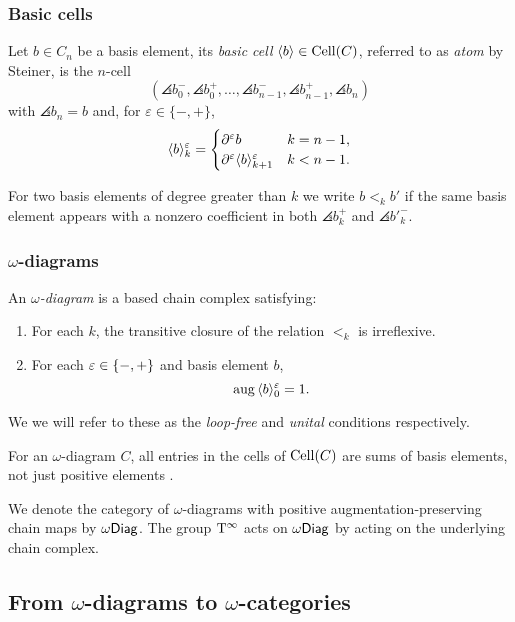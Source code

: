 \subsubsection{Basic cells}

Let $b \in C_n$ be a basis element, its \textit{basic cell} $\langle b\rangle \in \mathrm{Cell}(C)$, referred to as \textit{atom} by Steiner, is the $n$-cell
\[
(\angles{b}_0^-,\angles{b}_0^+,\dots,\angles{b}_{n-1}^-,\angles{b}_{n-1}^+,\angles{b}_n)
\]
with $\angles{b}_n = b$ and, for $\varepsilon \in \{-,+\}$,
\[
\langle b\rangle_k^\varepsilon =
\begin{cases}
	\partial^\varepsilon b & k = n-1, \\
	\partial^\varepsilon \langle b\rangle^\varepsilon_{k+1} & k < n-1.
\end{cases}
\]

For two basis elements of degree greater than $k$ we write $b <_k b'$ if the same basis element appears with a nonzero coefficient in both $\angles{b}^+_k$ and $\angles{b'}^-_k$.

\subsubsection{$\omega$-diagrams}

\begin{definition}
	\label{def:chain-loop-free}
	An \textit{$\omega$-diagram} is a based chain complex satisfying:
	\begin{enumerate}
		\item\label{i:loop-free} For each $k$, the transitive closure of the relation $<_k$ is irreflexive.
		\item\label{i:unital} For each $\varepsilon \in \{-,+\}$ and basis element $b$,
		\[
		\operatorname{aug}\, \langle b\rangle^\varepsilon_0 = 1.
		\]
	\end{enumerate}
	We we will refer to these as the \textit{loop-free} and \textit{unital} conditions respectively.
\end{definition}

For an $\omega$-diagram $C$, all entries in the cells of $\mathrm{Cell}(C)$ are sums of basis elements, not just positive elements \cite[Theorem 4.1]{steiner2012opetopes}.

We denote the category of $\omega$-diagrams with positive augmentation-preserving chain maps by $\omega\mathsf{Diag}$.
The group $\mathrm{T}^\infty$ acts on $\omega\mathsf{Diag}$ by acting on the underlying chain complex.

\subsection{From $\omega$-diagrams to $\omega$-categories}\label{ss:free omega-category}

